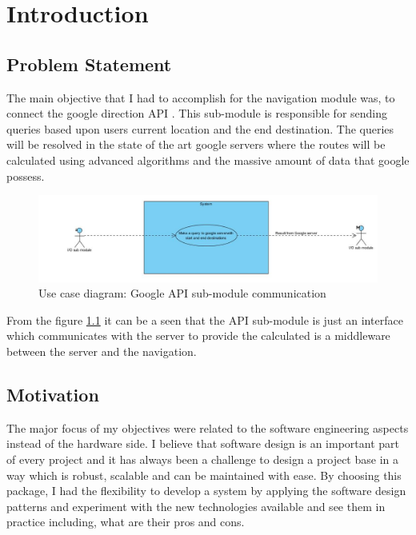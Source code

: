 \newpage
\chapter{Introduction}
	\section{Problem Statement}
		The main objective that I had to accomplish for the navigation module was, to connect the google direction API \cite{googleDirecAPI}. 
		This sub-module is responsible for sending queries based upon users current location and the end destination. 
		The queries will be resolved in the state of the art google servers where the 
		routes will be calculated using advanced algorithms and the massive amount of data that google possess. 

		\begin{figure}[htbp!]
			\centering \includegraphics[scale=0.65]{grafiken/googleServerCommunication.jpg}
			\caption{Use case diagram: Google API sub-module communication}
			\label{fig:Google API communication}
		\end{figure}

	\par
		From the figure \ref{fig:Google API communication} it can be a seen that the API sub-module is 
		just an interface which communicates with the server to provide the calculated is a 
		middleware between the server and the navigation.

	\section{Motivation}
		The major focus of my objectives were related to the software engineering aspects instead of
		the hardware side. I believe that software design is an important part of every project and
		it has always been a challenge to design a project base
		in a way which is robust, scalable and can be maintained with ease. By choosing this package,
		I had the flexibility to develop a system by applying the software design patterns and experiment with 
		the new	technologies available and see them in practice including, what are their pros and cons. 

